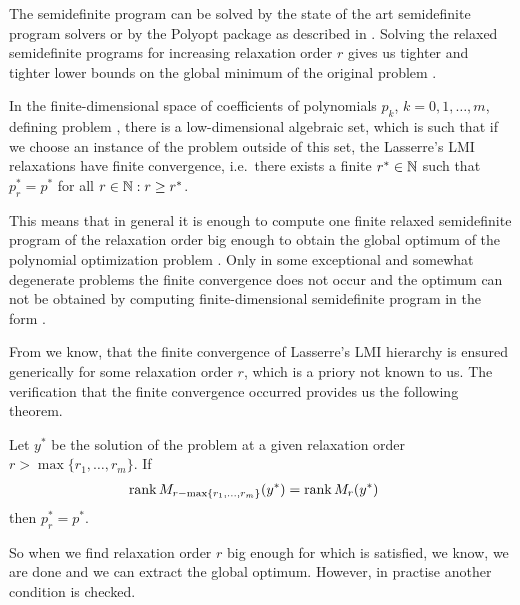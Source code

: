 The semidefinite program  can be solved by the state of the art semidefinite program solvers or by the Polyopt package as described in .
Solving the relaxed semidefinite programs for increasing relaxation order $r$ gives us tighter and tighter lower bounds on the global minimum of the original problem .

\begin{theorem}
  In the finite-dimensional space of coefficients of polynomials $p_k$, $k = 0, 1, \ldots, m$, defining problem , there is a low-dimensional algebraic set, which is such that if we choose an instance of the problem  outside of this set, the Lasserre's LMI relaxations have finite convergence, i.e.\ there exists a finite $r^*\in\mathbb{N}$ such that $p^*_r=p^*$ for all $r\in\mathbb{N}: r\geq r^*$.
\end{theorem}

This means that in general it is enough to compute one finite relaxed semidefinite program  of the relaxation order big enough to obtain the global optimum of the polynomial optimization problem .
Only in some exceptional and somewhat degenerate problems the finite convergence does not occur and the optimum can not be obtained by computing finite-dimensional semidefinite program in the form .

From  we know, that the finite convergence of Lasserre's LMI hierarchy is ensured generically for some relaxation order $r$, which is a priory not known to us.
The verification that the finite convergence occurred provides us the following theorem.

\begin{theorem}
  Let $y^*$ be the solution of the problem  at a given relaxation order $r > \max\{r_1,\ldots,r_m\}$.
  If
  \begin{align}
    \operatorname{rank} M_{r-\max\{r_1,\ldots,r_m\}}(y^*) &= \operatorname{rank} M_r(y^*)
  \end{align}
  then $p^*_r = p^*$.
\end{theorem}

So when we find relaxation order $r$ big enough for which  is satisfied, we know, we are done and we can extract the global optimum.
However, in practise another condition is checked.

